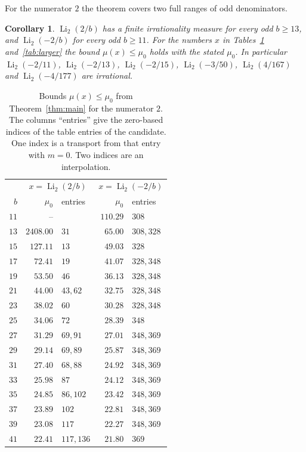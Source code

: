 \documentclass[11pt]{amsart}
\newtheorem{corollary}[theorem]{Corollary}
\theoremstyle{definition}
\theoremstyle{remark}
\numberwithin{equation}{section}
\newcommand{\Li}{\operatorname{Li}}
\begin{document}
For the numerator $2$ the theorem covers two full ranges of odd denominators.

\begin{corollary}\label{cor:two}
$\Li_2(2/b)$ has a finite irrationality measure for every odd $b\ge13$, and $\Li_2(-2/b)$ for every odd $b\ge11$. For
the numbers $x$ in Tables~\ref{tab:two} and~\ref{tab:larger} the bound $\mu(x)\le\mu_0$ holds with the stated $\mu_0$.
In particular $\Li_2(-2/11)$, $\Li_2(-2/13)$, $\Li_2(-2/15)$, $\Li_2(-3/50)$, $\Li_2(4/167)$ and $\Li_2(-4/177)$ are
irrational.
\end{corollary}

\begin{table}[ht]
\centering
\renewcommand{\arraystretch}{1.1}
\setlength{\tabcolsep}{4pt}
\begin{tabular}{@{}r|rl|rl@{}}
\toprule
 & \multicolumn{2}{c|}{$x=\Li_2(2/b)$} & \multicolumn{2}{c}{$x=\Li_2(-2/b)$}\\
$b$ & $\mu_0$ & entries & $\mu_0$ & entries\\
\midrule
$11$ & -- & & $110.29$ & $308$\\
$13$ & $2408.00$ & $31$ & $65.00$ & $308,328$\\
$15$ & $127.11$ & $13$ & $49.03$ & $328$\\
$17$ & $72.41$ & $19$ & $41.07$ & $328,348$\\
$19$ & $53.50$ & $46$ & $36.13$ & $328,348$\\
$21$ & $44.00$ & $43,62$ & $32.75$ & $328,348$\\
$23$ & $38.02$ & $60$ & $30.28$ & $328,348$\\
$25$ & $34.06$ & $72$ & $28.39$ & $348$\\
$27$ & $31.29$ & $69,91$ & $27.01$ & $348,369$\\
$29$ & $29.14$ & $69,89$ & $25.87$ & $348,369$\\
$31$ & $27.40$ & $68,88$ & $24.92$ & $348,369$\\
$33$ & $25.98$ & $87$ & $24.12$ & $348,369$\\
$35$ & $24.85$ & $86,102$ & $23.42$ & $348,369$\\
$37$ & $23.89$ & $102$ & $22.81$ & $348,369$\\
$39$ & $23.08$ & $117$ & $22.27$ & $348,369$\\
$41$ & $22.41$ & $117,136$ & $21.80$ & $369$\\
\bottomrule
\end{tabular}
\caption{Bounds $\mu(x)\le\mu_0$ from Theorem~\ref{thm:main} for the numerator $2$. The columns ``entries'' give the
zero-based indices of the table entries of the candidate. One index is a transport from that entry with $m=0$. Two
indices are an interpolation.}\label{tab:two}
\end{table}
\end{document}
